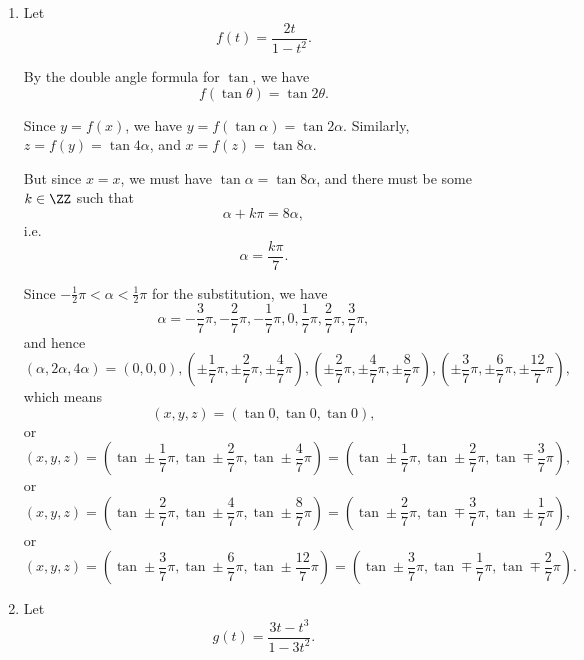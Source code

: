 \Question{\currfilebase}

\begin{enumerate}
    \item Let
          \[
              f(t) = \frac{2t}{1 - t^2}.
          \]

          By the double angle formula for \(\tan\), we have
          \[
              f(\tan \theta) = \tan 2\theta.
          \]

          Since \(y = f(x)\), we have \(y = f(\tan \alpha) = \tan 2 \alpha\). Similarly, \(z = f(y) = \tan 4 \alpha\), and \(x = f(z) = \tan 8 \alpha\).

          But since \(x = x\), we must have \(\tan \alpha = \tan 8 \alpha\), and there must be some \(k \in \ZZ\) such that
          \[
              \alpha + k\pi = 8 \alpha,
          \]
          i.e.
          \[
              \alpha = \frac{k\pi}{7}.
          \]

          Since \(-\frac{1}{2}\pi < \alpha < \frac{1}{2}\pi\) for the substitution, we have
          \[
              \alpha = -\frac{3}{7}\pi, -\frac{2}{7}\pi, -\frac{1}{7}\pi, 0, \frac{1}{7}\pi, \frac{2}{7}\pi, \frac{3}{7}\pi,
          \]
          and hence
          \[
              (\alpha, 2\alpha, 4\alpha) = \left(0, 0, 0\right), \left(\pm \frac{1}{7}\pi, \pm \frac{2}{7}\pi, \pm \frac{4}{7}\pi\right), \left(\pm \frac{2}{7}\pi, \pm \frac{4}{7}\pi, \pm \frac{8}{7}\pi\right), \left(\pm \frac{3}{7}\pi, \pm \frac{6}{7}\pi, \pm \frac{12}{7}\pi\right),
          \]
          which means
          \[
              (x, y, z) = \left(\tan 0, \tan 0, \tan 0\right),
          \]
          or
          \[
              (x, y, z) = \left(\tan \pm \frac{1}{7} \pi, \tan \pm \frac{2}{7}\pi, \tan \pm \frac{4}{7}\pi\right) = \left(\tan \pm \frac{1}{7} \pi, \tan \pm \frac{2}{7}\pi, \tan \mp \frac{3}{7}\pi\right),
          \]
          or
          \[
              (x, y, z) = \left(\tan \pm \frac{2}{7}\pi, \tan \pm \frac{4}{7}\pi, \tan \pm \frac{8}{7}\pi\right) = \left(\tan \pm \frac{2}{7}\pi, \tan \mp \frac{3}{7}\pi, \tan \pm \frac{1}{7}\pi\right),
          \]
          or
          \[
              (x, y, z) = \left(\tan \pm \frac{3}{7}\pi, \tan \pm \frac{6}{7}\pi, \tan \pm \frac{12}{7}\pi\right) = \left(\tan \pm \frac{3}{7}\pi, \tan \mp \frac{1}{7}\pi, \tan \mp \frac{2}{7}\pi\right).
          \]

    \item Let
          \[
              g(t) = \frac{3t - t^3}{1 - 3t^2}.
          \]


\end{enumerate}
